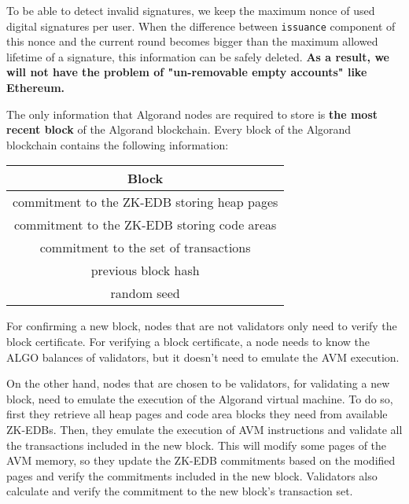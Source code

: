 \documentclass[11pt, A4]{report}
\begin{document}
    To be able to detect invalid signatures, we keep the maximum nonce of used digital signatures per user. When the
    difference between \texttt{issuance} component of this nonce and the current round becomes bigger than the
    maximum allowed lifetime of a signature, this information can be safely deleted. \textbf{As a result, we will not
    have the problem of "un-removable empty accounts" like Ethereum.}

    The only information that Algorand nodes are required to store is \textbf{the most recent block} of the Algorand
    blockchain. Every block of the Algorand blockchain contains the following information:

    \begin{center}
        \begin{tabular}{||c||}
            \hline
            Block \\ [0.5ex]
            \hline\hline
            commitment to the ZK-EDB storing heap pages \\ [0.7ex]
            commitment to the ZK-EDB storing code areas \\ [0.7ex]
            commitment to the set of transactions       \\ [0.7ex]
            previous block hash                         \\ [0.7ex]
            random seed                                 \\ [0.7ex]
            \hline
        \end{tabular}
    \end{center}

    For confirming a new block, nodes that are not validators only need to verify the block certificate. For
    verifying a block certificate, a node needs to know the ALGO balances of validators, but it doesn't need to
    emulate the AVM execution.

    On the other hand, nodes that are chosen to be validators, for validating a new block, need to emulate the
    execution of the Algorand virtual machine. To do so, first they retrieve all heap pages and code area blocks they
    need from available ZK-EDBs. Then, they emulate the execution of AVM instructions and validate all the
    transactions included in the new block. This will modify some pages of the AVM memory, so they update the ZK-EDB
    commitments based on the modified pages and verify the commitments included in the new block. Validators also
    calculate and verify the commitment to the new block's transaction set.
\end{document}
